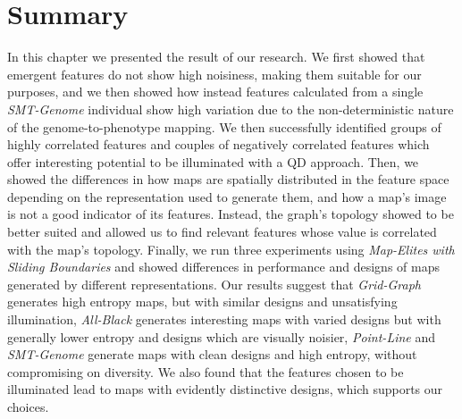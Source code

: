 \section{Summary}
In this chapter we presented the result of our research. We first showed that emergent features do not show high noisiness, making them suitable for our purposes, and we then showed how instead features calculated from a single \textit{SMT-Genome} individual show high variation due to the non-deterministic nature of the genome-to-phenotype mapping. We then successfully identified groups of highly correlated features and couples of negatively correlated features which offer interesting potential to be illuminated with a QD approach. Then, we showed the differences in how maps are spatially distributed in the feature space depending on the representation used to generate them, and how a map's image is not a good indicator of its features. Instead, the graph's topology showed to be better suited and allowed us to find relevant features whose value is correlated with the map's topology. Finally, we run three experiments using \textit{Map-Elites with Sliding Boundaries} and showed differences in performance and designs of maps generated by different representations. Our results suggest that \textit{Grid-Graph} generates high entropy maps, but with similar designs and unsatisfying illumination, \textit{All-Black} generates interesting maps with varied designs but with generally lower entropy and designs which are visually noisier, \textit{Point-Line} and \textit{SMT-Genome} generate maps with clean designs and high entropy, without compromising on diversity. We also found that the features chosen to be illuminated lead to maps with evidently distinctive designs, which supports our choices. 